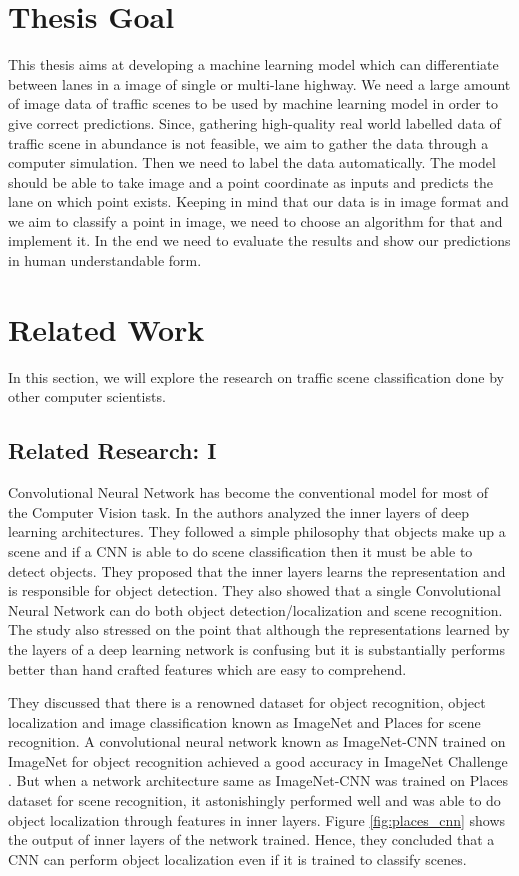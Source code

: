 \section{Thesis Goal}
This thesis aims at developing a machine learning model which can differentiate between lanes in a image of single or multi-lane highway. We need a large amount of image data of traffic scenes to be used by machine learning model in order to give correct predictions. Since, gathering high-quality real world labelled data of traffic scene in abundance is not feasible, we aim to gather the data through a computer simulation. Then we need to label the data automatically. The model should be able to take image and a point coordinate as inputs and predicts the lane on which point exists. Keeping in mind that our data is in image format and we aim to classify a point in image, we need to choose an algorithm for that and implement it. In the end we need to evaluate the results and show our predictions in human understandable form.
\section{Related Work}
In this section, we will explore the research on traffic scene classification done by other computer scientists.
\subsection{Related Research: I}
\par
Convolutional Neural Network has become the conventional model for most of the Computer Vision task. In \cite{zhou2014object} the authors analyzed the inner layers of deep learning architectures. They followed a simple philosophy that objects make up a scene and if a CNN is able to do scene classification then it must be able to detect objects. They proposed that the inner layers learns the representation and is responsible for object detection. They also showed that a single Convolutional Neural Network can do both object detection/localization and scene recognition. The study also stressed on the point that although the representations learned by the layers of a deep learning network is confusing but it is substantially performs better than hand crafted features which are easy to comprehend.
\par
They discussed that there is a renowned dataset for object recognition, object localization and image classification known as ImageNet \cite{deng2009imagenet} and Places \cite{zhou2017places} for scene recognition. A convolutional neural network known as ImageNet-CNN \cite{donahue2014decaf} trained on ImageNet for object recognition achieved a good accuracy in ImageNet Challenge \cite{Russakovsky2015}. But when a network architecture same as ImageNet-CNN was trained on Places dataset for scene recognition, it astonishingly performed well and was able to do object localization through features in inner layers. Figure \ref{fig:places_cnn} shows the output of inner layers of the network trained. Hence, they concluded that a CNN can perform object localization even if it is trained to classify scenes.

